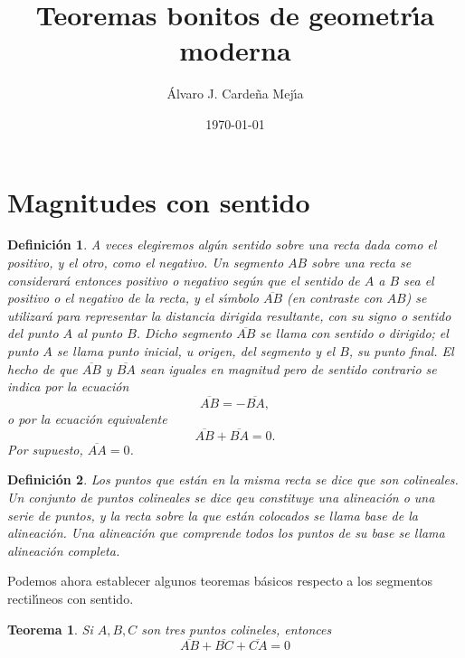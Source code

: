 \documentclass[a4paper,11pt]{article}
\title{Teoremas bonitos de geometr\'{\i}a moderna}
\author{\'Alvaro J. Carde\~na Mej\'{\i}a}
\date{\today}
\theoremstyle{teoremas}
\newtheorem{teorema}{Teorema}[section]
\theoremstyle{ejemplos}
\theoremstyle{definiciones}
\theoremstyle{lemas}
\newtheorem*{definicion}{Definici\'on}
\begin{document}
\maketitle

\section{Magnitudes con sentido}

\begin{definicion}
 A veces elegiremos alg\'un sentido sobre una recta dada como el positivo, y el otro, como el negativo. Un segmento $AB$ sobre una recta se considerar\'a entonces \textit{positivo} o \textit{negativo} seg\'un que el sentido de $A$ a $B$ sea el positivo o el negativo de la recta, y el s\'{\i}mbolo $\overline{AB}$ (en contraste con $AB$) se utilizar\'a para representar la distancia dirigida resultante, con su signo o sentido del punto $A$ al punto $B$. Dicho segmento $\overline{AB}$ se llama \textit{con sentido} o \textit{dirigido}; el punto $A$ se llama \textit{punto inicial}, u origen, del segmento y el $B$, su \textit{punto final}. El hecho de que $\overline{AB}$ y $\overline{BA}$ sean iguales en magnitud pero de sentido contrario se indica por la ecuaci\'on
 \begin{equation*}
  \overline{AB} = - \overline{BA},
 \end{equation*}
 o por la ecuaci\'on equivalente
 \begin{equation*}
  \overline{AB} + \overline{BA} = 0.
 \end{equation*}
 Por supuesto, $\overline{AA} = 0$.
\end{definicion}

\begin{definicion}
 Los puntos que est\'an en la misma recta se dice que son \textit{colineales}. Un conjunto de puntos colineales se dice qeu constituye una \textit{alineaci\'on} o una \textit{serie de puntos}, y la recta sobre la que est\'an colocados se llama \textit{base} de la alineaci\'on. Una alineaci\'on que comprende todos los puntos de su base se llama \textit{alineaci\'on completa}.
\end{definicion}

Podemos ahora establecer algunos teoremas b\'asicos respecto a los segmentos rectil\'{\i}neos con sentido.

\begin{teorema}
 Si $A, B, C$ son tres puntos colineles, entonces
 \begin{equation*}
  \overline{AB} + \overline{BC} + \overline{CA} = 0
 \end{equation*}
\end{teorema}
\end{document}

